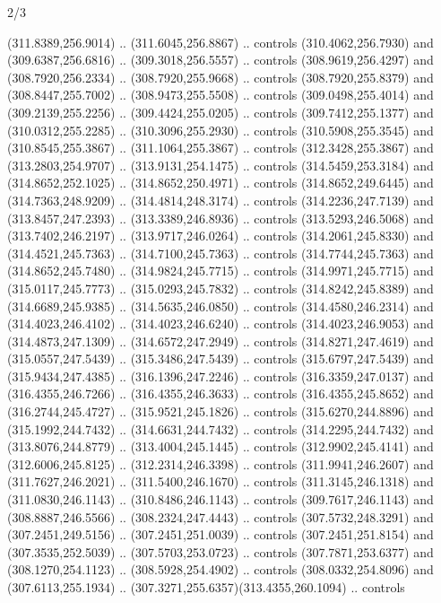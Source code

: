 \begin{flagdescription}{2/3}
\begin{scope}[xshift=0.5\flaglength,yshift=0.5\flagwidth,scale=\flagwidth/235.81]
\begin{scope}[y=0.8pt, x=0.8pt, yscale=-1,shift={(-239.08,-147.38)}]
    (311.8389,256.9014) .. (311.6045,256.8867) .. controls (310.4062,256.7930) and
    (309.6387,256.6816) .. (309.3018,256.5557) .. controls (308.9619,256.4297) and
    (308.7920,256.2334) .. (308.7920,255.9668) .. controls (308.7920,255.8379) and
    (308.8447,255.7002) .. (308.9473,255.5508) .. controls (309.0498,255.4014) and
    (309.2139,255.2256) .. (309.4424,255.0205) .. controls (309.7412,255.1377) and
    (310.0312,255.2285) .. (310.3096,255.2930) .. controls (310.5908,255.3545) and
    (310.8545,255.3867) .. (311.1064,255.3867) .. controls (312.3428,255.3867) and
    (313.2803,254.9707) .. (313.9131,254.1475) .. controls (314.5459,253.3184) and
    (314.8652,252.1025) .. (314.8652,250.4971) .. controls (314.8652,249.6445) and
    (314.7363,248.9209) .. (314.4814,248.3174) .. controls (314.2236,247.7139) and
    (313.8457,247.2393) .. (313.3389,246.8936) .. controls (313.5293,246.5068) and
    (313.7402,246.2197) .. (313.9717,246.0264) .. controls (314.2061,245.8330) and
    (314.4521,245.7363) .. (314.7100,245.7363) .. controls (314.7744,245.7363) and
    (314.8652,245.7480) .. (314.9824,245.7715) .. controls (314.9971,245.7715) and
    (315.0117,245.7773) .. (315.0293,245.7832) .. controls (314.8242,245.8389) and
    (314.6689,245.9385) .. (314.5635,246.0850) .. controls (314.4580,246.2314) and
    (314.4023,246.4102) .. (314.4023,246.6240) .. controls (314.4023,246.9053) and
    (314.4873,247.1309) .. (314.6572,247.2949) .. controls (314.8271,247.4619) and
    (315.0557,247.5439) .. (315.3486,247.5439) .. controls (315.6797,247.5439) and
    (315.9434,247.4385) .. (316.1396,247.2246) .. controls (316.3359,247.0137) and
    (316.4355,246.7266) .. (316.4355,246.3633) .. controls (316.4355,245.8652) and
    (316.2744,245.4727) .. (315.9521,245.1826) .. controls (315.6270,244.8896) and
    (315.1992,244.7432) .. (314.6631,244.7432) .. controls (314.2295,244.7432) and
    (313.8076,244.8779) .. (313.4004,245.1445) .. controls (312.9902,245.4141) and
    (312.6006,245.8125) .. (312.2314,246.3398) .. controls (311.9941,246.2607) and
    (311.7627,246.2021) .. (311.5400,246.1670) .. controls (311.3145,246.1318) and
    (311.0830,246.1143) .. (310.8486,246.1143) .. controls (309.7617,246.1143) and
    (308.8887,246.5566) .. (308.2324,247.4443) .. controls (307.5732,248.3291) and
    (307.2451,249.5156) .. (307.2451,251.0039) .. controls (307.2451,251.8154) and
    (307.3535,252.5039) .. (307.5703,253.0723) .. controls (307.7871,253.6377) and
    (308.1270,254.1123) .. (308.5928,254.4902) .. controls (308.0332,254.8096) and
    (307.6113,255.1934) .. (307.3271,255.6357)(313.4355,260.1094) .. controls

\end{scope}
\end{scope}
\end{flagdescription}
